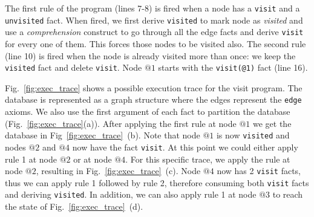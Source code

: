The first rule of the program (lines 7-8) is fired when a node has a \texttt{visit} and a \texttt{unvisited} fact. When fired, we first derive \texttt{visited} to mark node as \textit{visited} and use a
\emph{comprehension} construct to go through all the edge facts and derive \texttt{visit} for every
one of them. This forces those nodes to be visited also. The second rule (line 10) is fired when the
node is already visited more than once: we keep the \texttt{visited} fact and delete \texttt{visit}.
Node $@1$ starts with the \texttt{visit(@1)} fact (line 16).

Fig.~\ref{fig:exec_trace} shows a possible execution trace for the visit program.
The database is represented as a graph structure where the edges represent the \texttt{edge}
axioms. We also use the first argument of each fact to partition the database (Fig.~\ref{fig:exec_trace}(a)).
After applying the first rule at node $@1$ we get the database in Fig~\ref{fig:exec_trace}~(b).
Note that node $@1$ is now \texttt{visited} and nodes $@2$
and $@4$ now have the fact \texttt{visit}. At this point we could either apply rule 1 at
node $@2$ or at node $@4$. For this specific trace, we apply the rule at node $@2$, resulting
in Fig.~\ref{fig:exec_trace}~(c). Node $@4$ now has 2 \texttt{visit} facts, thus
we can apply rule 1 followed by rule 2, therefore consuming both \texttt{visit} facts
and deriving \texttt{visited}. In addition, we can also apply rule 1 at node $@3$ to
reach the state of Fig.~\ref{fig:exec_trace}~(d).

